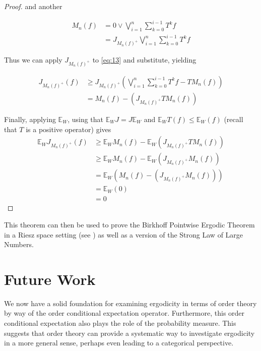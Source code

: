 \documentclass[letterpaper,10pt,oneside,onecolumn,reqno]{amsart}
\newcommand{\E}{\mathbb E}
\theoremstyle{definition}
\newcommand{\join}{\vee}
\begin{document}
\begin{proof}
  and another

  \begin{align}
    \label{eq:15}
    M_n(f) &= 0 \join \bigvee_{i=1}^n\sum\limits_{k=0}^{i-1} T^{k}f \\
    \label{eq:16}
    &= J_{M_n{(f)}^+}\bigvee_{i=1}^n\sum\limits_{k=0}^{i-1} T^{k}f
  \end{align}

  Thus we can apply $J_{M_n{(f)}^+}$ to \eqref{eq:13} and substitute,
  yielding

  \begin{align}
    \label{eq:17}
    J_{M_n{(f)}^+}(f) &\geq J_{M_n{(f)}^+}(\bigvee_{i=1}^{n}\sum\limits_{k=0}^{i-1} T^{k}f - TM_n(f)) \\
    \label{eq:18}
    &= M_n(f)-(J_{M_n{(f)}^+}TM_n(f))
  \end{align}

  Finally, applying $\E_W$, using that $\E_W J=J\E_W$ and $\E_W T(f)
  \leq \E_W(f) $ (recall that $T$ is a positive operator) gives
  \begin{align*}
    \label{eq:19}
    \E_W J_{M_n{(f)}^+}(f)&\geq \E_W M_n(f)-\E_W(J_{M_n{(f)}^+}TM_n(f)) \\
    &\geq \E_W M_n(f)-\E_W(J_{M_n{(f)}^+}M_n(f)) \\
    &= \E_W(M_n(f)-(J_{M_n{(f)}^+}M_n(f))) \\
    &= \E_W(0) \\
    &= 0
  \end{align*}
\end{proof}

This theorem can then be used to prove the Birkhoff Pointwise Ergodic
Theorem in a Riesz space setting (see \cite{Kuo2007422}) as well as a
version of the Strong Law of Large Numbers.

\part{Future Work}

We now have a solid foundation for examining ergodicity in terms of
order theory by way of the order conditional expectation
operator. Furthermore, this order conditional expectation also plays
the role of the probability measure. This suggests that order theory
can provide a systematic way to investigate ergodicity in a more
general sense, perhaps even leading to a categorical perspective.
\end{document}
